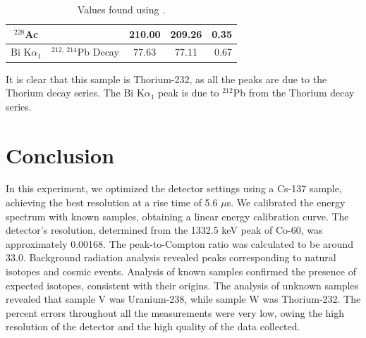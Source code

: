 \documentclass{article}
\begin{document}
\begin{table}[h]
{\begin{tabular}{|ccccr|}
	\multicolumn{1}{|c|}{$^{228}$Ac}     & \multicolumn{1}{c|}{}                                   & \multicolumn{1}{c|}{210.00}  & \multicolumn{1}{c|}{209.26}  & 0.35 \\ \hline
	\multicolumn{1}{|c|}{Bi K$\alpha_1$} & \multicolumn{1}{c|}{$^{212, \ 214}$Pb Decay}              & \multicolumn{1}{c|}{77.63}   & \multicolumn{1}{c|}{77.11}   & 0.67 \\ \hline
	\end{tabular}
	}
	\caption{Values found using \cite{plotzki_2024_highresolution}.}
	\label{tab:W}
\end{table}



It is clear that this sample is Thorium-232, as all the peaks are due to the Thorium decay series. The Bi K$\alpha_1$ peak is due to $^{212}$Pb from the Thorium decay series.

\pagebreak{}

\section{Conclusion}

In this experiment, we optimized the detector settings using a Cs-137 sample, achieving the best resolution at a rise time of 5.6 $\mu$s. We calibrated the energy spectrum with known samples, obtaining a linear energy calibration curve. The detector's resolution, determined from the 1332.5 keV peak of Co-60, was approximately 0.00168. The peak-to-Compton ratio was calculated to be around 33.0. Background radiation analysis revealed peaks corresponding to natural isotopes and cosmic events. Analysis of known samples confirmed the presence of expected isotopes, consistent with their origins. The analysis of unknown samples revealed that sample V was Uranium-238, while sample W was Thorium-232. 
The percent errors throughout all the measurements were very low, owing the high resolution of the detector and the high quality of the data collected.


\pagebreak{}
\end{document}
